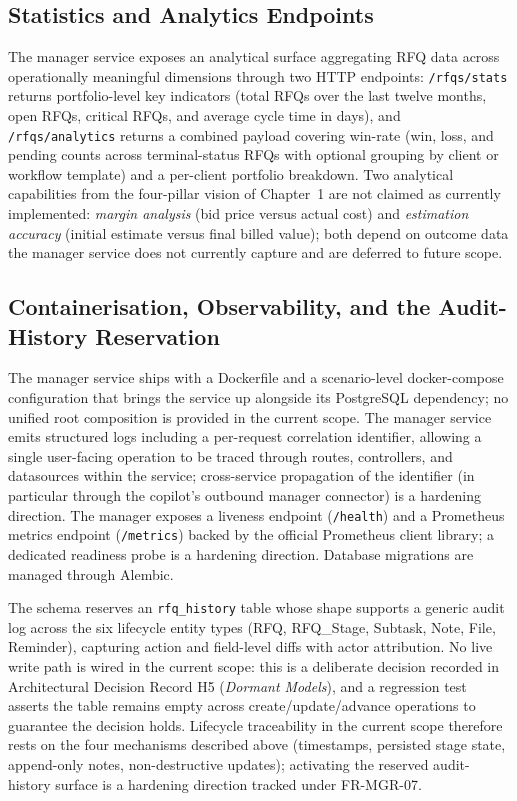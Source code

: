 \subsection{Statistics and Analytics Endpoints}
The manager service exposes an analytical surface aggregating RFQ data across operationally meaningful dimensions through two HTTP endpoints: \texttt{/rfqs/stats} returns portfolio-level key indicators (total RFQs over the last twelve months, open RFQs, critical RFQs, and average cycle time in days), and \texttt{/rfqs/analytics} returns a combined payload covering win-rate (win, loss, and pending counts across terminal-status RFQs with optional grouping by client or workflow template) and a per-client portfolio breakdown. Two analytical capabilities from the four-pillar vision of Chapter~1 are not claimed as currently implemented: \textit{margin analysis} (bid price versus actual cost) and \textit{estimation accuracy} (initial estimate versus final billed value); both depend on outcome data the manager service does not currently capture and are deferred to future scope.

\subsection{Containerisation, Observability, and the Audit-History Reservation}
The manager service ships with a Dockerfile and a scenario-level docker-compose configuration that brings the service up alongside its PostgreSQL dependency; no unified root composition is provided in the current scope. The manager service emits structured logs including a per-request correlation identifier, allowing a single user-facing operation to be traced through routes, controllers, and datasources within the service; cross-service propagation of the identifier (in particular through the copilot's outbound manager connector) is a hardening direction. The manager exposes a liveness endpoint (\texttt{/health}) and a Prometheus metrics endpoint (\texttt{/metrics}) backed by the official Prometheus client library; a dedicated readiness probe is a hardening direction. Database migrations are managed through Alembic.

The schema reserves an \texttt{rfq\_history} table whose shape supports a generic audit log across the six lifecycle entity types (RFQ, RFQ\_Stage, Subtask, Note, File, Reminder), capturing action and field-level diffs with actor attribution. No live write path is wired in the current scope: this is a deliberate decision recorded in Architectural Decision Record H5 (\textit{Dormant Models}), and a regression test asserts the table remains empty across create/update/advance operations to guarantee the decision holds. Lifecycle traceability in the current scope therefore rests on the four mechanisms described above (timestamps, persisted stage state, append-only notes, non-destructive updates); activating the reserved audit-history surface is a hardening direction tracked under FR-MGR-07.

